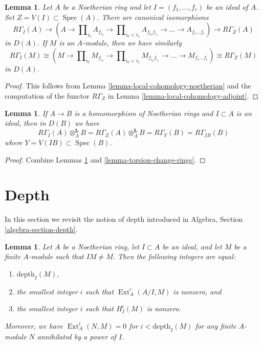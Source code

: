 \documentclass{stacks-project}
\theoremstyle{plain}
\newtheorem{lemma}[subsection]{Lemma}
\theoremstyle{definition}
\theoremstyle{remark}
\numberwithin{equation}{subsection}
\def\Spec{\mathop{\mathrm{Spec}}}
\def\Ext{\mathop{\mathrm{Ext}}\nolimits}
\begin{document}
\begin{lemma}
\label{lemma-compute-local-cohomology-noetherian}
Let $A$ be a Noetherian ring and let $I = (f_1, \ldots, f_r)$ be an ideal
of $A$. Set $Z = V(I) \subset \Spec(A)$. There are canonical isomorphisms
$$
R\Gamma_I(A) \to
(A \to \prod\nolimits_{i_0} A_{f_{i_0}} \to
\prod\nolimits_{i_0 < i_1} A_{f_{i_0}f_{i_1}} \to
\ldots \to A_{f_1\ldots f_r}) \to R\Gamma_Z(A)
$$
in $D(A)$. If $M$ is an $A$-module, then we have similarly
$$
R\Gamma_I(M) \cong
(M \to \prod\nolimits_{i_0} M_{f_{i_0}} \to
\prod\nolimits_{i_0 < i_1} M_{f_{i_0}f_{i_1}} \to
\ldots \to M_{f_1\ldots f_r}) \cong R\Gamma_Z(M)
$$
in $D(A)$.
\end{lemma}

\begin{proof}
This follows from Lemma \ref{lemma-local-cohomology-noetherian}
and the computation of the functor $R\Gamma_Z$ in
Lemma \ref{lemma-local-cohomology-adjoint}.
\end{proof}

\begin{lemma}
\label{lemma-local-cohomology-change-rings}
If $A \to B$ is a homomorphism of Noetherian rings and $I \subset A$
is an ideal, then in $D(B)$ we have
$$
R\Gamma_I(A) \otimes_A^\mathbf{L} B =
R\Gamma_Z(A) \otimes_A^\mathbf{L} B =
R\Gamma_Y(B) = R\Gamma_{IB}(B)
$$
where $Y = V(IB) \subset \Spec(B)$.
\end{lemma}

\begin{proof}
Combine Lemmas \ref{lemma-compute-local-cohomology-noetherian} and
\ref{lemma-torsion-change-rings}.
\end{proof}






\section{Depth}
\label{section-depth}

\noindent
In this section we revisit the notion of depth introduced in
Algebra, Section \ref{algebra-section-depth}.

\begin{lemma}
\label{lemma-depth}
Let $A$ be a Noetherian ring, let $I \subset A$ be an ideal, and
let $M$ be a finite $A$-module such that $IM \not = M$. Then
the following integers are equal:
\begin{enumerate}
\item $\text{depth}_I(M)$,
\item the smallest integer $i$ such that $\Ext_A^i(A/I, M)$
is nonzero, and
\item the smallest integer $i$ such that $H^i_I(M)$ is nonzero.
\end{enumerate}
Moreover, we have $\Ext^i_A(N, M) = 0$ for $i < \text{depth}_I(M)$
for any finite $A$-module $N$ annihilated by a power of $I$.
\end{lemma}
\end{document}
